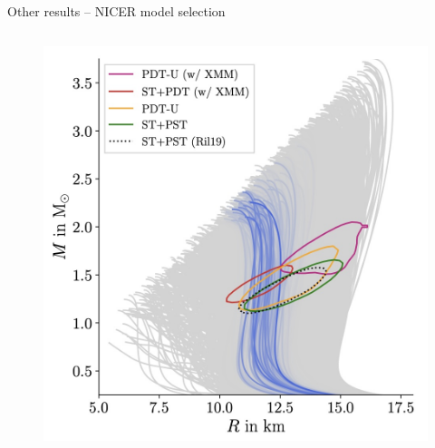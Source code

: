 \documentclass[usenames,dvipsnames,t]{beamer}
\begin{document}
\begin{frame}{Other results -- NICER model selection}
\begin{columns}
      \begin{figure}
        \centering
        \includegraphics[width=0.95\linewidth]{Figures/figure_NICER_v2.jpg}
      \end{figure}
      
    \end{columns}
\end{frame}
\end{document}
